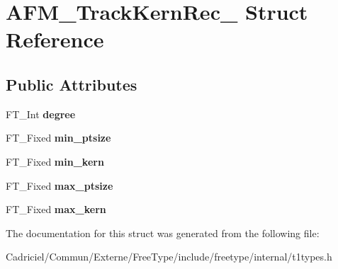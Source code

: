 \hypertarget{struct_a_f_m___track_kern_rec__}{\section{A\-F\-M\-\_\-\-Track\-Kern\-Rec\-\_\- Struct Reference}
\label{struct_a_f_m___track_kern_rec__}
}
\subsection*{Public Attributes}
\begin{DoxyCompactItemize}
\item 
\hypertarget{struct_a_f_m___track_kern_rec___a15272593c1a0ea05ca3687e7c2de26b6}{F\-T\-\_\-\-Int {\bfseries degree}}\label{struct_a_f_m___track_kern_rec___a15272593c1a0ea05ca3687e7c2de26b6}

\item 
\hypertarget{struct_a_f_m___track_kern_rec___a7b1e7fd74d92dcf2b89fee7f74d4fdba}{F\-T\-\_\-\-Fixed {\bfseries min\-\_\-ptsize}}\label{struct_a_f_m___track_kern_rec___a7b1e7fd74d92dcf2b89fee7f74d4fdba}

\item 
\hypertarget{struct_a_f_m___track_kern_rec___aee6f40c722e14ee2fb17948ce19d0499}{F\-T\-\_\-\-Fixed {\bfseries min\-\_\-kern}}\label{struct_a_f_m___track_kern_rec___aee6f40c722e14ee2fb17948ce19d0499}

\item 
\hypertarget{struct_a_f_m___track_kern_rec___a2b22a268fb0654a035ec59d3dfa3dfa4}{F\-T\-\_\-\-Fixed {\bfseries max\-\_\-ptsize}}\label{struct_a_f_m___track_kern_rec___a2b22a268fb0654a035ec59d3dfa3dfa4}

\item 
\hypertarget{struct_a_f_m___track_kern_rec___a8e25a36b738a2de3fa5c08e477b5a6a2}{F\-T\-\_\-\-Fixed {\bfseries max\-\_\-kern}}\label{struct_a_f_m___track_kern_rec___a8e25a36b738a2de3fa5c08e477b5a6a2}

\end{DoxyCompactItemize}


The documentation for this struct was generated from the following file\-:\begin{DoxyCompactItemize}
\item 
Cadriciel/\-Commun/\-Externe/\-Free\-Type/include/freetype/internal/t1types.\-h\end{DoxyCompactItemize}
